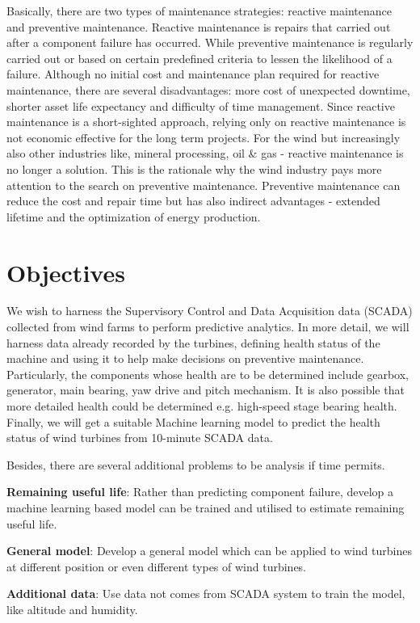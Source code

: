 \documentclass[english,a4paper,11pt]{article}
\begin{document}
Basically, there are two types of maintenance strategies: reactive maintenance and preventive maintenance. Reactive maintenance is repairs that carried out after a component failure has occurred. While preventive maintenance is regularly carried out or based on certain predefined criteria to lessen the likelihood of a failure. Although no initial cost and maintenance plan required for reactive maintenance, there are several disadvantages: more cost of unexpected downtime, shorter asset life expectancy and difficulty of time management. Since reactive maintenance is a short-sighted approach, relying only on reactive maintenance is not economic effective for the long term projects. For the wind but increasingly also other industries like, mineral processing, oil \& gas - reactive maintenance is no longer a solution. This is the rationale why the wind industry pays more attention to the search on preventive maintenance. Preventive maintenance can reduce the cost and repair time but has also indirect advantages - extended lifetime and the optimization of energy production.

\section{Objectives}
We wish to harness the Supervisory Control and Data Acquisition data (SCADA) collected from wind farms to perform predictive analytics. In more detail, we will harness data already recorded by the turbines, defining health status of the machine and using it to help make decisions on preventive maintenance. Particularly, the components whose health are to be determined include gearbox, generator, main bearing, yaw drive and pitch mechanism. It is also possible that more detailed health could be determined e.g. high-speed stage bearing health. Finally, we will get a suitable Machine learning model to predict the health status of wind turbines from 10-minute SCADA data. 

Besides, there are several additional problems to be analysis if time permits. 

\textbf{Remaining useful life}: Rather than predicting component failure, develop a machine learning based model can be trained and utilised to estimate remaining useful life.

\textbf{General model}: Develop a general model which can be applied to wind turbines at different position or even different types of wind turbines. 

\textbf{Additional data}: Use data not comes from SCADA system to train the model, like altitude and humidity.
\end{document}
